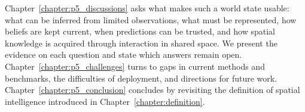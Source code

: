 Chapter~\ref{chapter:p5_discussions} asks what makes such a world state usable: what can be inferred from limited observations, what must be represented, how beliefs are kept current, when predictions can be trusted, and how spatial knowledge is acquired through interaction in shared space.
We present the evidence on each question and state which answers remain open.
Chapter~\ref{chapter:p5_challenges} turns to gaps in current methods and benchmarks, the difficulties of deployment, and directions for future work. 
Chapter~\ref{chapter:p5_conclusion} concludes by revisiting the definition of spatial intelligence introduced in Chapter~\ref{chapter:definition}.

\newpage




